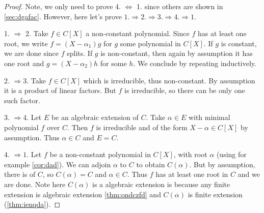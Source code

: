 \documentclass{article}
\begin{document}
\begin{proof}
Note, we only need to prove 4. $\Longleftrightarrow $ 1. since others are shown in \cref{sec:dgafac}. However, here let's prove $1 . \Rightarrow 2 . \Rightarrow 3 . \Rightarrow 4 . \Rightarrow 1$.

1. $\Rightarrow$ 2. Take $f \in C[X]$ a non-constant polynomial. Since $f$ has at least one root, we write $f=\left(X-\alpha_{1}\right) g$ for $g$ some polynomial in $C[X]$. If $g$ is constant, we are done since $f$ splits. If $g$ is non-constant, then again by assumption it has one root and $g=\left(X-\alpha_{2}\right) h$ for some $h$. We conclude by repeating inductively.

2. $\Rightarrow 3$. Take $f \in C[X]$ which is irreducible, thus non-constant. By assumption it is a product of linear factors. But $f$ is irreducible, so there can be only one such factor.

3. $\Rightarrow 4$. Let $E$ be an algebraic extension of $C$. Take $\alpha \in E$ with minimal polynomial $f$ over $C$. Then $f$ is irreducible and of the form $X-\alpha \in C[X]$ by assumption. Thus $\alpha \in C$ and $E=C$.

4. $\Rightarrow 1$. Let $f$ be a non-constant polynomial in $C[X]$, with root $\alpha$ (using for example \cref{cor:dad}). We can adjoin $\alpha$ to $C$ to obtain $C(\alpha)$. But by assumption, there is  of $C$, so $C(\alpha)=C$ and $\alpha \in C$. Thus $f$ has at least one root in $C$ and we are done. Note here  $C(\alpha)$ is a algebraic extension  is because  any finite extension is algebraic extension  \cref{thm:ondczfd} and $C(\alpha)$ is finite extension (\cref{thm:ienqda}).

\end{proof}
\end{document}
